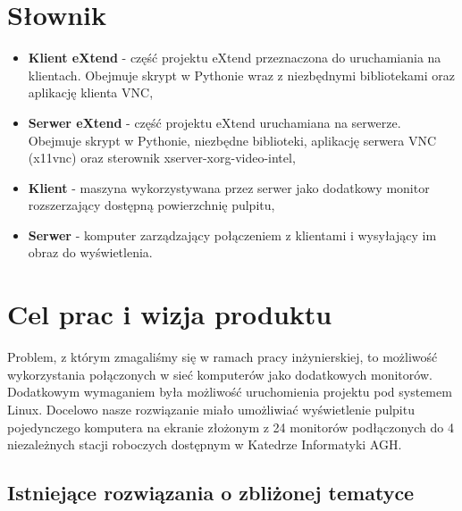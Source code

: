 

\usepackage{verbatim}

\subtitle{}
\maketitle

\tableofcontents
\vfill
\pagebreak

\section{Słownik}

  \begin{itemize}
    \item \textbf{Klient eXtend} - część projektu eXtend przeznaczona do uruchamiania na klientach. Obejmuje skrypt w Pythonie wraz z niezbędnymi bibliotekami oraz aplikację klienta VNC,
    \item \textbf{Serwer eXtend} - część projektu eXtend uruchamiana na serwerze. Obejmuje skrypt w Pythonie, niezbędne biblioteki, aplikację serwera VNC (x11vnc) oraz sterownik xserver-xorg-video-intel,
    \item \textbf{Klient} - maszyna wykorzystywana przez serwer jako dodatkowy monitor rozszerzający dostępną powierzchnię pulpitu,
    \item \textbf{Serwer} - komputer zarządzający połączeniem z klientami i wysyłający im obraz do wyświetlenia.
  \end{itemize}

\section{Cel prac i wizja produktu}

  Problem, z którym zmagaliśmy się w ramach pracy inżynierskiej, to możliwość wykorzystania połączonych w sieć komputerów jako dodatkowych monitorów. Dodatkowym wymaganiem była możliwość uruchomienia projektu pod systemem Linux. Docelowo nasze rozwiązanie miało umożliwiać wyświetlenie pulpitu pojedynczego komputera na ekranie złożonym z 24 monitorów podłączonych do 4 niezależnych stacji roboczych dostępnym w Katedrze Informatyki AGH.

  \subsection{Istniejące rozwiązania o zbliżonej tematyce}

